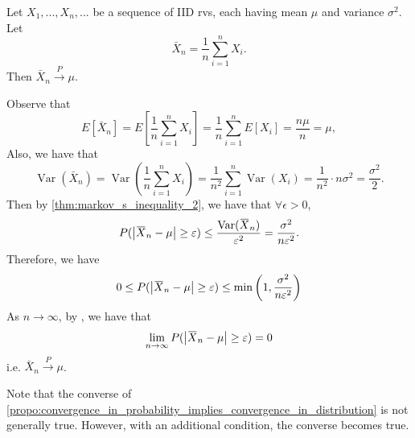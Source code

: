 \documentclass[notoc,notitlepage]{tufte-book}
\DeclareMathOperator{\Var}{Var }
\newcommand{\convp}{\overset{P}{\to}}
\begin{document}
\begin{eg}\label{eg:weak_law_of_large_numbers}\label{eg:bernoulli_s_theorem}
  Let $X_1, ..., X_n, ...$ be a sequence of IID rvs, each having mean $\mu$ and variance $\sigma^2$. Let
  \begin{equation*}
    \bar{X}_n = \frac{1}{n} \sum_{i=1}^{n} X_i.
  \end{equation*}
  Then $\bar{X}_n \convp \mu$.
\end{eg}

\begin{solution}
  Observe that
  \begin{equation*}
    E\left[\bar{X}_n\right] = E\left[ \frac{1}{n} \sum_{i=1}^{n} X_i \right] = \frac{1}{n} \sum_{i=1}^{n} E[X_i] = \frac{n \mu}{n} = \mu,
  \end{equation*}
  Also, we have that
  \begin{equation*}
    \Var\left( \bar{X}_n \right) = \Var\left( \frac{1}{n} \sum_{i=1}^{n} X_i \right) = \frac{1}{n^2} \sum_{i=1}^{n} \Var(X_i) = \frac{1}{n^2} \cdot n \sigma^2 = \frac{\sigma^2}{2}.
  \end{equation*}
  Then by \cref{thm:markov_s_inequality_2}, we have that $\forall \epsilon > 0$,
  \begin{equation*}
    P(\abs{\bar{X}_n - \mu} \geq \epsilon) \leq \frac{\Var(\bar{X}_n)}{\epsilon^2} = \frac{\sigma^2}{n \epsilon^2}.
  \end{equation*}
  Therefore, we have
  \begin{equation*}
    0 \leq P(\abs{\bar{X}_n - \mu} \geq \epsilon) \leq \min\left( 1, \frac{\sigma^2}{n \epsilon^2} \right)
  \end{equation*}
  As $n \to \infty$, by , we have that
  \begin{equation*}
    \lim_{n \to \infty} P(\abs{\bar{X}_n - \mu} \geq \epsilon) = 0
  \end{equation*}
  i.e. $\bar{X}_n \convp \mu$.
\end{solution}

Note that the converse of \cref{propo:convergence_in_probability_implies_convergence_in_distribution} is not generally true.  However, with an additional condition, the converse becomes true.
\end{document}
